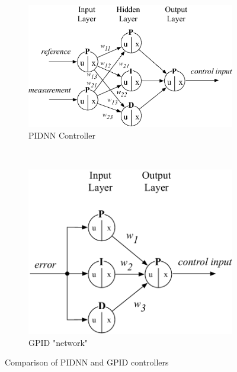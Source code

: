 \documentclass[conference]{IEEEtran}
\begin{document}
\begin{figure}[h]
\centering
\begin{subfigure}{.5\textwidth}
  \centering
  \includegraphics[width=0.8\linewidth]{figs/pidnn.pdf}
  \caption{PIDNN Controller \cite{shu2000pid}}
  \label{fig:pidnn}
\end{subfigure} \\ \vspace{0.5cm}
\begin{subfigure}{.5\textwidth}
  \centering
  \includegraphics[width=.65\linewidth]{figs/gpid.pdf}
  \caption{GPID "network"}
  \label{fig:gpid}
\end{subfigure}
\caption{Comparison of PIDNN and GPID controllers}
\label{fig:controllers}
\end{figure}
\end{document}
